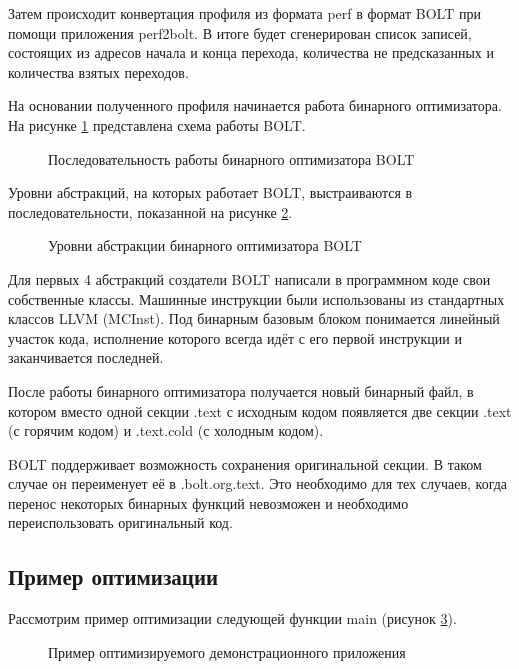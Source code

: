 Затем происходит конвертация профиля из формата perf в формат BOLT при помощи приложения perf2bolt. В итоге будет сгенерирован список записей, состоящих из адресов начала и конца перехода, количества не предсказанных и количества взятых переходов.

На основании полученного профиля начинается работа бинарного оптимизатора. На рисунке \cref{fig:BinOptSteps} представлена схема работы BOLT.

\begin{figure}[!h]
    \centerfloat{
        \texttt{[image: 3]}
    }
    \caption{Последовательность работы бинарного оптимизатора BOLT}\label{fig:BinOptSteps}
\end{figure}

Уровни абстракций, на которых работает BOLT, выстраиваются в последовательности, показанной на рисунке \cref{fig:BOLTAbst}.

\begin{figure}[!h]
    \centerfloat{
        \texttt{[image: 4]}
    }
    \caption{Уровни абстракции бинарного оптимизатора BOLT}\label{fig:BOLTAbst}
\end{figure}

Для первых 4 абстракций создатели BOLT написали в программном коде свои собственные классы. Машинные инструкции были использованы из стандартных классов LLVM (MCInst). Под бинарным базовым блоком понимается линейный участок кода, исполнение которого всегда идёт с его первой инструкции и заканчивается последней.

После работы бинарного оптимизатора получается новый бинарный файл, в котором вместо одной секции .text с исходным кодом появляется две секции .text (с горячим кодом) и .text.cold (с холодным кодом).
	
BOLT поддерживает возможность сохранения оригинальной секции. В таком случае он переименует её в .bolt.org.text. Это необходимо для тех случаев, когда перенос некоторых бинарных функций невозможен и необходимо переиспользовать оригинальный код.


\subsection{Пример оптимизации}\label{subsec:ch1/sec3/sub2}

Рассмотрим пример оптимизации следующей функции main (рисунок \cref{fig:TestCode}).

\begin{figure}[!h]
    \centerfloat{
        \texttt{[image: 5]}
    }
    \caption{Пример оптимизируемого демонстрационного приложения}\label{fig:TestCode}
\end{figure}

